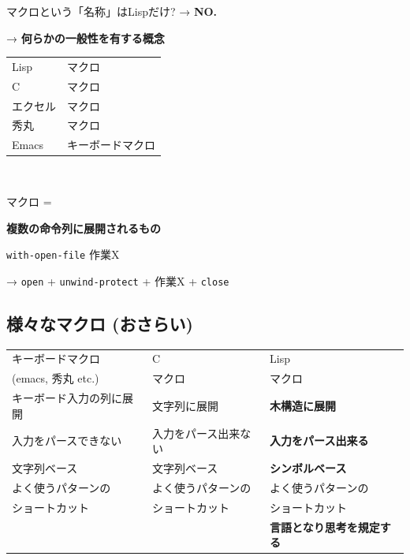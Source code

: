 \begin{container-fluid}
\begin{row-fluid}
\begin{span7}
マクロという「名称」はLispだけ? → \textbf{NO.}

\begin{alignright}
→ \textbf{何らかの一般性を有する概念}
\end{alignright}
\end{span7}
\begin{span5}
\begin{center}
\begin{tabular}{ll}
Lisp & マクロ\\
C & マクロ\\
エクセル & マクロ\\
秀丸 & マクロ\\
Emacs & キーボードマクロ\\
\end{tabular}
\end{center}
\end{span5}
\end{row-fluid}
\begin{row-fluid}
　
\end{row-fluid}
\begin{row-fluid}
\begin{span5}
マクロ = 

\textbf{複数の命令列に展開されるもの}
\end{span5}
\begin{span7}
\texttt{with-open-file} 作業X 

→ \texttt{open} + \texttt{unwind-protect} + 作業X + \texttt{close}
\end{span7}
\end{row-fluid}
\end{container-fluid}

\subsection{様々なマクロ (おさらい)}
\label{sec-2-2}

\begin{center}
\begin{tabular}{lll}
キーボードマクロ & C & Lisp\\
(emacs, 秀丸 etc.) & マクロ & マクロ\\
\hline
キーボード入力の列に展開 & 文字列に展開 & \textbf{木構造に展開}\\
\hline
入力をパースできない & 入力をパース出来ない & \textbf{入力をパース出来る}\\
\hline
文字列ベース & 文字列ベース & \textbf{シンボルベース}\\
\hline
よく使うパターンの & よく使うパターンの & よく使うパターンの\\
ショートカット & ショートカット & ショートカット\\
\hline
 &  & \textbf{言語となり思考を規定する}\\
\hline
\end{tabular}
\end{center}

